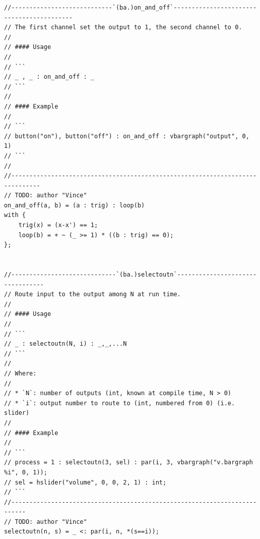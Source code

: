 \documentclass{article}
\begin{document}
\begin{lstlisting}[caption=\texttt{basics.lib}]
//----------------------------`(ba.)on_and_off`------------------------------------------
// The first channel set the output to 1, the second channel to 0.
//
// #### Usage
//
// ```
// _ , _ : on_and_off : _
// ```
//
// #### Example
//
// ```
// button("on"), button("off") : on_and_off : vbargraph("output", 0, 1)
// ```
//
//------------------------------------------------------------------------------
// TODO: author "Vince"
on_and_off(a, b) = (a : trig) : loop(b)
with {
    trig(x) = (x-x') == 1;
    loop(b) = + ~ (_ >= 1) * ((b : trig) == 0);
};


//-----------------------------`(ba.)selectoutn`---------------------------------
// Route input to the output among N at run time.
//
// #### Usage
//
// ```
// _ : selectoutn(N, i) : _,_,...N
// ```
//
// Where:
//
// * `N`: number of outputs (int, known at compile time, N > 0)
// * `i`: output number to route to (int, numbered from 0) (i.e. slider)
//
// #### Example
//
// ```
// process = 1 : selectoutn(3, sel) : par(i, 3, vbargraph("v.bargraph %i", 0, 1));
// sel = hslider("volume", 0, 0, 2, 1) : int;
// ```
//--------------------------------------------------------------------------
// TODO: author "Vince"
selectoutn(n, s) = _ <: par(i, n, *(s==i));



\end{lstlisting}
\end{document}
